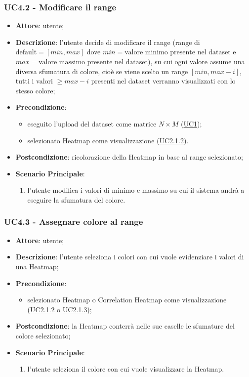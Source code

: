     \subsubsection{UC4.2 - Modificare il range}
    \label{uc4.2}
    \begin{itemize}
    \item \textbf{Attore}: utente;
    \item \textbf{Descrizione}: l'utente decide di modificare il range (range di $\textrm{default}=[min, max]$ dove $min=\textrm{valore minimo presente nel dataset}$ e $max=\textrm{valore massimo presente nel dataset}$), su cui ogni valore assume una diversa sfumatura di colore, cioè se viene scelto un range $[min, max-i]$, tutti i valori $\geq max-i$ presenti nel dataset verranno visualizzati con lo stesso colore;
    \item \textbf{Precondizione}: 
    \begin{itemize}
        \item eseguito l'upload del dataset come matrice $N\times M$ (\hyperref[uc1]{UC1});
        \item selezionato Heatmap come visualizzazione (\hyperref[uc2.1.2]{UC2.1.2}).
    \end{itemize}  
    \item \textbf{Postcondizione}: ricolorazione della Heatmap in base al range selezionato;
    \item \textbf{Scenario Principale}: 
    \begin{enumerate}
        \item l'utente modifica i valori di minimo e massimo su cui il sistema andrà a eseguire la sfumatura del colore.
    \end{enumerate}  
    \end{itemize}
    
     \subsubsection{UC4.3 - Assegnare colore al range}
    \label{uc4.3}
    
    \begin{itemize}
    \item \textbf{Attore}: utente;
    \item \textbf{Descrizione}: l'utente seleziona i colori con cui vuole evidenziare i valori di una Heatmap;
    \item \textbf{Precondizione}: 
    \begin{itemize}
        \item selezionato Heatmap o Correlation Heatmap come visualizzazione (\hyperref[uc2.1.2]{UC2.1.2} o \hyperref[uc2.1.3]{UC2.1.3});
    \end{itemize}  
    \item \textbf{Postcondizione}: la Heatmap conterrà nelle sue caselle le sfumature del colore selezionato;
    \item \textbf{Scenario Principale}: 
    \begin{enumerate}
        \item l'utente seleziona il colore con cui vuole visualizzare la Heatmap.
    \end{enumerate}  
    \end{itemize}

